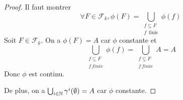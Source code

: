 \ifdefined\outputproof
\begin{proof}
	Il faut montrer
	\begin{equation}
		\forall F \in \mathcal{F}_{k}, \phi(F) = \displaystyle \bigcup_{\substack{f \subseteq
			F \\ f \, \text{ finie}}} \phi(f)
	\end{equation}
	Soit $F \in \mathcal{F}_{k}$.
	On a $\phi(F) = A$ car $\phi$ constante et
	\begin{equation}
		\bigcup_{\substack{f \subseteq F \\ f \, finie}} \phi(f) =
		\bigcup_{\substack{f \subseteq F \\ f \, finie}} A = A
	\end{equation}
	Donc $\phi$ est continu.

	De plus, on a $\bigcup_{i \in \mathbb{N}} \gamma^{i}(\emptyset) = A$ car
	$\phi$ constante.
\end{proof}
\fi









